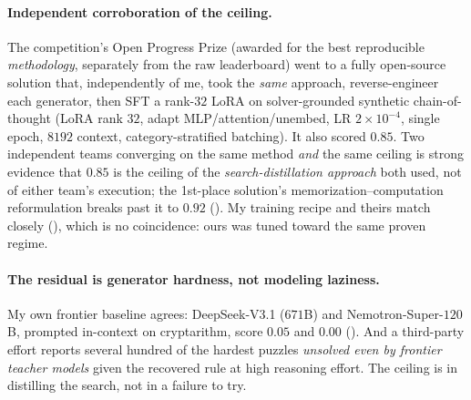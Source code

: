 \documentclass[11pt]{article}
\begin{document}
\paragraph{Independent corroboration of the ceiling.} The competition's Open Progress Prize
(awarded for the best reproducible \emph{methodology}, separately from the raw leaderboard)
went to a fully open-source solution \citep{huikang2026nemotron, huikang_kaggle2026} that,
independently of me, took the \emph{same} approach, reverse-engineer each generator, then SFT a rank-$32$ LoRA on
solver-grounded synthetic chain-of-thought (LoRA rank $32$, adapt MLP/attention/unembed, LR
$2\times10^{-4}$, single epoch, $8192$ context, category-stratified batching). It also scored
$\mathbf{0.85}$. Two independent teams converging on the same method \emph{and} the same
ceiling is strong evidence that $0.85$ is the ceiling of the \emph{search-distillation approach}
both used, not of either team's execution; the 1st-place solution's memorization--computation
reformulation breaks past it to $0.92$ (). My training recipe and theirs match
closely (), which is no coincidence: ours was tuned toward the same proven regime.

\paragraph{The residual is generator hardness, not modeling laziness.} My own frontier
baseline agrees: DeepSeek-V3.1 ($671$B) and Nemotron-Super-$120$B, prompted in-context on
cryptarithm, score $0.05$ and $0.00$ (). And a third-party effort reports
several hundred of the hardest puzzles \emph{unsolved even by frontier teacher models} given the
recovered rule at high reasoning effort. The ceiling is in distilling the search, not in a failure to try.
\end{document}
